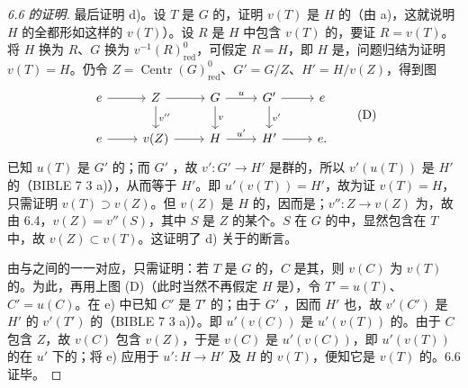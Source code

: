 \begin{proof}[6.6 的证明]
最后证明 d)。设 $T$ 是 $G$ 的，证明 $v(T)$ 是 $H$ 的（由 a)，这就说明 $H$ 的全都形如这样的 $v(T)$）。设 $R$ 是 $H$ 中包含 $v(T)$ 的，要证 $R=v(T)$。将 $H$ 换为 $R$、$G$ 换为 $v^{-1}(R)^0_{\mathrm{red}}$，可假定 $R=H$，即 $H$ 是，问题归结为证明 $v(T)=H$。仍令 $Z=\operatorname{Centr}(G)^0_{\mathrm{red}}$、$G'=G/Z$、$H'=H/v(Z)$，得到图
\[
\begin{tikzcd}
e\arrow[r]&Z\arrow[r]\arrow[d,"v''"]&G\arrow[r,"u"]\arrow[d,"v"]&G'\arrow[r]\arrow[d,"v'"]&e\\
e\arrow[r]&v(Z)\arrow[r]&H\arrow[r,"u'"]&H'\arrow[r]&e.
\end{tikzcd}\tag{D}
\]
已知 $u(T)$ 是 $G'$ 的；而 $G'$ ，故 $v':G'\to H'$ 是群的，所以 $v'(u(T))$ 是 $H'$ 的（BIBLE 7  3 a)），从而等于 $H'$。即 $u'(v(T))=H'$，故为证 $v(T)=H$，只需证明 $v(T)\supset v(Z)$。但 $v(Z)$ 是 $H$ 的，因而是；$v'':Z\to v(Z)$ 为，故由 6.4，$v(Z)=v''(S)$，其中 $S$ 是 $Z$ 的某个。$S$ 在 $G$ 的中，显然包含在 $T$ 中，故 $v(Z)\subset v(T)$。这证明了 d) 关于的断言。

由与之间的一一对应，只需证明：若 $T$ 是 $G$ 的，$C$ 是其，则 $v(C)$ 为 $v(T)$ 的。为此，再用上图 (D)（此时当然不再假定 $H$ 是），令 $T'=u(T)$、$C'=u(C)$。在 e) 中已知 $C'$ 是 $T'$ 的；由于 $G'$ ，因而 $H'$ 也，故 $v'(C')$ 是 $H'$ 的 $v'(T')$ 的（BIBLE 7  3 a)）。即 $u'(v(C))$ 是 $u'(v(T))$ 的。由于 $C$ 包含 $Z$，故 $v(C)$ 包含 $v(Z)$，于是 $v(C)$ 是 $u'(v(C))$，即 $u'(v(T))$ 的在 $u'$ 下的；将 e) 应用于 $u':H\to H'$ 及 $H$ 的 $v(T)$，便知它是 $v(T)$ 的。6.6 证毕。
\end{proof}

